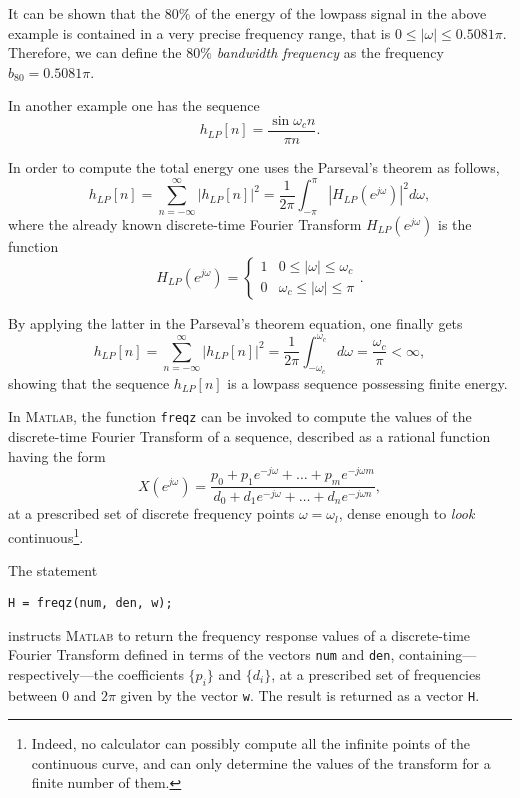 \documentclass[\documentfontsize, twocolumn]{\classname}
\begin{document}
It can be shown that the $80\%$ of the energy of the lowpass signal in the above example is contained in a very precise frequency range, that is $0 \leq |\omega| \leq 0.5081\pi$. Therefore, we can define the \emph{$80\%$ bandwidth frequency} as the frequency $b_{80} = 0.5081\pi$.

In another example one has the sequence
\[
    h_{LP}[n] = \frac {\sin {\omega_c n}}{\pi n}.
\]

In order to compute the total energy one uses the Parseval's theorem as follows,
\[
h_{LP}[n] = \sum_{n=-\infty}^\infty \left|h_{LP}[n]\right|^2 = \frac 1 {2\pi} \int_{-\pi}^\pi \left|H_{LP}(e^{j\omega})\right|^2d\omega,
\]
where the already known discrete-time Fourier Transform $H_{LP}(e^{j\omega})$ is the function
\[
    H_{LP}(e^{j\omega}) = \left\{\begin{array}{ll}
        1 & 0 \leq |\omega| \leq \omega_c\\
        0 & \omega_c \leq |\omega| \leq \pi
        \end{array}\right..
\]

By applying the latter in the Parseval's theorem equation, one finally gets
\[
h_{LP}[n] = \sum_{n=-\infty}^\infty \left|h_{LP}[n]\right|^2 = \frac 1 {2\pi} \int_{-\omega_c}^{\omega_c} d\omega = \frac {\omega_c} \pi < \infty,
\]
showing that the sequence $h_{LP}[n]$ is a lowpass sequence possessing finite energy.


In \textsc{Matlab}, the function \texttt{freqz} can be invoked to compute the values of the discrete-time Fourier Transform of a sequence, described as a rational function having the form
\begin{equation}\label{eqn:dtftRationalForm}
    X(e^{j\omega}) = \frac
    {p_0 + p_1e^{-j\omega} + \dots + p_m e^{-j\omega m}}
    {d_0 + d_1e^{-j\omega} + \dots + d_n e^{-j\omega n}},
\end{equation}
at a prescribed set of discrete frequency points $\omega = \omega_l$, dense enough to \emph{look} continuous\footnote{Indeed, no calculator can possibly compute all the infinite points of the continuous curve, and can only determine the values of the transform for a finite number of them.}.

The statement
\begin{verbatim}
H = freqz(num, den, w);
\end{verbatim}
instructs \textsc{Matlab} to return the frequency response values of a discrete-time Fourier Transform defined in terms of the vectors \texttt{num} and \texttt{den}, con\-tain\-ing---res\-pec\-ti\-ve\-ly---the coefficients $\{p_i\}$ and $\{d_i\}$, at a prescribed set of frequencies between $0$ and $2\pi$ given by the vector \texttt{w}. The result is returned as a vector \texttt{H}.
\end{document}
